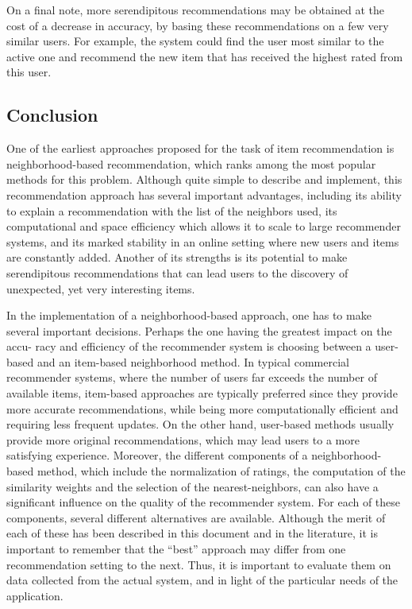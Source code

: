 On a final note, more serendipitous recommendations may be obtained at the cost of a decrease in accuracy, by basing these recommendations on a few very similar users. For example, the system could find the user most similar to the active one and recommend the new item that has received the highest rated from this user.

\subsection{Conclusion}


One of the earliest approaches proposed for the task of item recommendation is neighborhood-based recommendation, which ranks among the most popular methods for this problem. Although quite simple to describe and implement, this recommendation approach has several important advantages, including its ability to explain a recommendation with the list of the neighbors used, its computational and space efficiency which allows it to scale to large recommender systems, and its marked stability in an online setting where new users and items are constantly added. Another of its strengths is its potential to make serendipitous recommendations that can lead users to the discovery of unexpected, yet very interesting items.

In the implementation of a neighborhood-based approach, one has to make several important decisions. Perhaps the one having the greatest impact on the accu- racy and efficiency of the recommender system is choosing between a user-based and an item-based neighborhood method. In typical commercial recommender systems, where the number of users far exceeds the number of available items, item-based approaches are typically preferred since they provide more accurate recommendations, while being more computationally efficient and requiring less frequent updates. On the other hand, user-based methods usually provide more original recommendations, which may lead users to a more satisfying experience. Moreover, the different components of a neighborhood-based method, which include the normalization of ratings, the computation of the similarity weights and the selection of the nearest-neighbors, can also have a significant influence on the quality of the recommender system. For each of these components, several different alternatives are available. Although the merit of each of these has been described in this document and in the literature, it is important to remember that the “best” approach may differ from one recommendation setting to the next. Thus, it is important to evaluate them on data collected from the actual system, and in light of the particular needs of the application.

